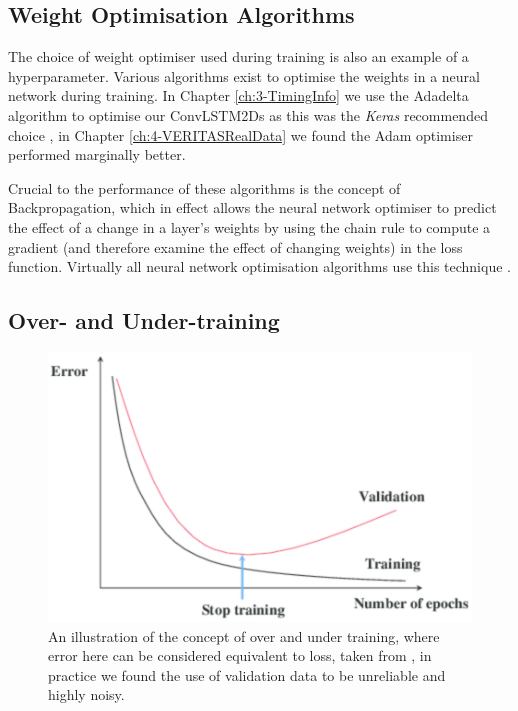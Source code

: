 \subsection{Weight Optimisation Algorithms}
The choice of weight optimiser used during training is also an example of a hyperparameter. Various algorithms exist to optimise the weights in a neural network during training. In Chapter \ref{ch:3-TimingInfo} we use the Adadelta algorithm to optimise our ConvLSTM2Ds as this was the \textit{Keras} recommended choice \cite{adadelta}, in Chapter \ref{ch:4-VERITASRealData} we found the Adam optimiser \cite{adam} performed marginally better.

Crucial to the performance of these algorithms is the concept of Backpropagation, which in effect allows the neural network optimiser to predict the effect of a change in a layer's weights by using the chain rule to compute a gradient (and therefore examine the effect of changing weights) in the loss function. Virtually all neural network optimisation algorithms use this technique \cite{goodfellow2016deep}.

\subsection{Over- and Under-training}
\begin{figure}[ht] 
        \centering \includegraphics[width=0.7\columnwidth]{figures/overtrain.png}
        \caption{
                \label{fig:earlystop} %
                An illustration of the concept of over and under training, where error here can be considered equivalent to loss, taken from \cite{earlystop}, in practice we found the use of validation data to be unreliable and highly noisy.
        }
\end{figure}

